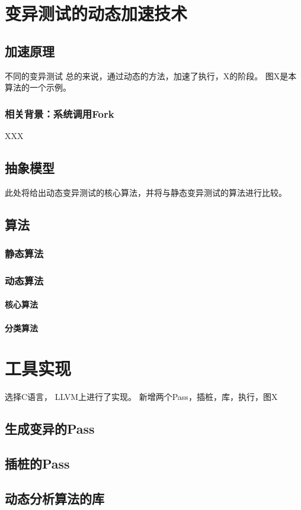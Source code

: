 \documentclass[nofonts]{ctexrep}
\begin{document}
\chapter{ 变异测试的动态加速技术}
\section{加速原理}
不同的变异测试
总的来说，通过动态的方法，加速了执行，X的阶段。
图X是本算法的一个示例。
\subsection{相关背景：系统调用Fork}
XXX
\section{抽象模型}
此处将给出动态变异测试的核心算法，并将与静态变异测试的算法进行比较。
\section{算法}
\subsection{静态算法}
\subsection{动态算法}
\subsubsection{核心算法}
\subsubsection{分类算法}

\chapter{工具实现}
选择C语言，
LLVM上进行了实现。
新增两个Pass，插桩，库，执行，图X
\section{生成变异的Pass}
\section{插桩的Pass}
\section{动态分析算法的库}
\end{document}
